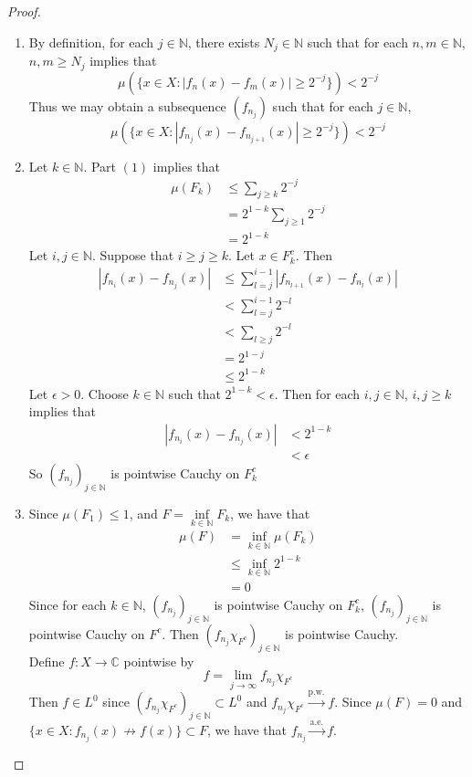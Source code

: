 \documentclass[12pt]{amsart}
\theoremstyle{definition}
\newcommand{\ep}{\epsilon}
\newcommand{\C}{\mathbb{C}}
\newcommand{\N}{\mathbb{N}}
\newcommand{\convt}[1]{\xrightarrow{\text{#1}}}
\begin{document}
	\begin{proof}\
	\begin{enumerate}
	\item By definition, for each $j \in \N$, there exists $N_j \in \N$ such that for each $n,m \in \N$, $n,m \geq N_j$ implies that 
	$$\mu(\{x \in X: |f_n(x) - f_m(x)| \geq 2^{-j} \}) < 2^{-j}$$ 
	Thus we may obtain a subsequence $(f_{n_j})$ such that for each $j \in \N$, 
	$$\mu(\{x \in X: |f_{n_j}(x) - f_{n_{j+1}}(x)| \geq 2^{-j}\}) < 2^{-j}$$
	\item Let $k \in \N$. Part $(1)$ implies that 
	\begin{align*}
	\mu(F_k) 
	&\leq \sum_{j \geq k}2^{-j} \\
	&= 2^{1-k}\sum_{j \geq 1}2^{-j}  \\
	&= 2^{1-k}
	\end{align*}
	Let $i, j \in \N$. Suppose that $i \geq j \geq k$. Let $x \in F_k^c$. Then 
	\begin{align*}
	|f_{n_i}(x) - f_{n_j}(x)| 
	& \leq \sum_{l = j}^{i-1} |f_{n_{l+1}}(x) - f_{n_l}(x)| \\
	& < \sum_{l = j}^{i-1} 2^{-l} \\
	& <  \sum_{l \geq j} 2^{-l} \\
	&= 2^{1 - j} \\
	& \leq 2^{1 - k}	 
	\end{align*}
	Let $\ep >0$. Choose $k \in \N$ such that $2^{1-k} < \ep$. Then for each $i,j \in \N$, $i,j \geq k$ implies that 
	\begin{align*}
	|f_{n_i}(x) - f_{n_j}(x)| 
	&< 2^{1-k} \\
	&< \ep 
	\end{align*}
	So $(f_{n_j})_{j \in \N}$ is pointwise Cauchy on $F_k^c$
	\item Since $\mu(F_1) \leq 1$, and $F = \inf\limits_{k \in \N}F_k$, we have that
	\begin{align*}
	\mu(F) 
	&= \inf_{k \in \N} \mu(F_k) \\
	&\leq \inf_{k \in \N} 2^{1-k} \\
	&= 0
	\end{align*}
	Since for each $k \in \N$, $(f_{n_j})_{j \in \N}$ is pointwise Cauchy on $F^c_k$, $(f_{n_j})_{j \in \N}$ is pointwise Cauchy on $F^c$. Then $(f_{n_j}\chi_{F^c})_{j \in \N}$ is pointwise Cauchy. \\
	Define $f: X \rightarrow \C$ pointwise by $$f = \lim_{j \rightarrow \infty}f_{n_j}\chi_{F^c} $$
	Then $f \in L^0$ since $(f_{n_j}\chi_{F^c})_{j \in \N} \subset L^0$ and $f_{n_j}\chi_{F^c} \convt{p.w.} f$. Since $\mu(F) = 0$ and $\{x \in X: f_{n_j}(x) \not \rightarrow f(x)\} \subset F$, we have that $f_{n_j} \convt{a.e.} f$.\\

\end{enumerate}
\end{proof}
\end{document}
